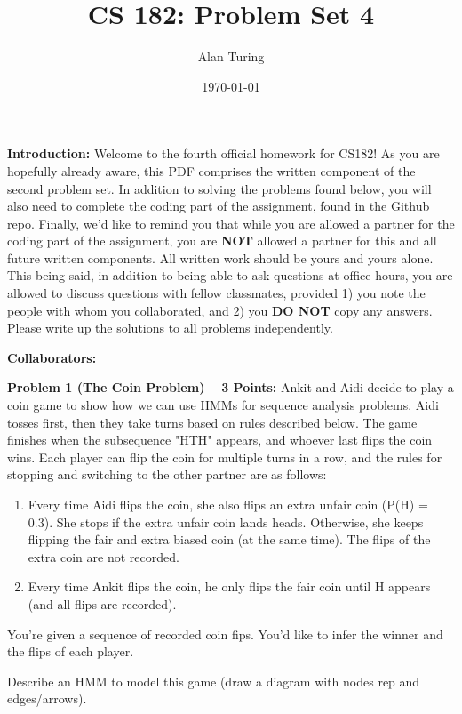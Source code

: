 \documentclass[]{article}
\title{CS 182: Problem Set 4}
\author{Alan Turing}
\date{\today}
\begin{document}
\maketitle

\textbf{Introduction:}  
Welcome to the fourth official homework for CS182!  As you are hopefully already aware, this PDF comprises the written component of the second problem set.  In addition to solving the problems found below, you will also need to complete the coding part of the assignment, found in the Github repo.  Finally, we'd like to remind you that while you are allowed a partner for the coding part of the assignment, you are \textbf{NOT} allowed a partner for this and all future written components.  All written work should be yours and yours alone.  This being said, in addition to being able to ask questions at office hours, you are allowed to discuss questions with fellow classmates, provided 1) you note the people with whom you collaborated, and 2) you \textbf{DO NOT} copy any answers.  Please write up the solutions to all problems independently.

\bigskip
\textbf{Collaborators:}

\clearpage

\textbf{Problem 1 (The Coin Problem) -- 3 Points:}
Ankit and Aidi decide to play a coin game to show how we can use HMMs for sequence analysis problems. Aidi tosses first, then they take turns based on rules described below. The game finishes when the subsequence "HTH" appears, and whoever last flips the coin wins. Each player can flip the coin for multiple turns in a row, and the rules for stopping and switching to the other partner are as follows:

\begin{enumerate}
    \item Every time Aidi flips the coin, she also flips an extra unfair coin (P(H) = 0.3). She stops if the extra unfair coin lands heads. Otherwise, she keeps flipping the fair and extra biased coin (at the same time). The flips of the extra coin are not recorded.
    \item Every time Ankit flips the coin, he only flips the fair coin until H appears (and all flips are recorded).
\end{enumerate}
You're given a sequence of recorded coin fips. You'd like to infer the winner and the flips of each player.

Describe an HMM to model this game (draw a diagram with nodes rep and edges/arrows).
\end{document}
